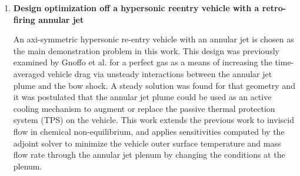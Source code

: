 \begin{enumerate}
  \item {\bf Design optimization off a hypersonic reentry vehicle with a
    retro-firing annular jet}

An axi-symmetric hypersonic re-entry vehicle with an annular jet is chosen as
the main demonstration problem in this work.  This design was previously
examined by Gnoffo et al.\cite{gnoffo2016tapping} for a perfect gas as a means
of increasing the time-averaged vehicle drag via unsteady interactions between
the annular jet plume and the bow shock.  A steady solution was found for that
geometry and it was postulated that the annular jet plume could be used as an
active cooling mechanism to augment or replace the passive thermal protection
system (TPS) on the vehicle.  This work extends the previous work to inviscid
flow in chemical non-equilibrium, and applies sensitivities computed by the
adjoint solver to minimize the vehicle outer surface temperature and mass flow
rate through the annular jet plenum by changing the conditions at the plenum.

\end{enumerate}
